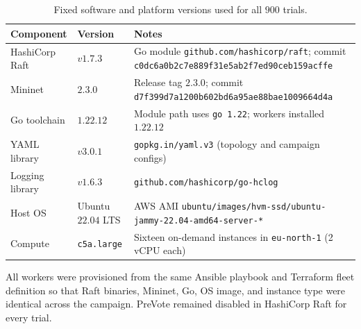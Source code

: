 \begin{table}[H]
  \centering
  \caption{Fixed software and platform versions used for all \(900\) trials.}
  \label{tab:software-versions}
  \footnotesize
  \begin{tabular}{llp{6.2cm}}
    \toprule
    Component & Version & Notes \\
    \midrule
    HashiCorp Raft & \(v1.7.3\) & Go module \texttt{github.com/hashicorp/raft}; commit \texttt{c0dc6a0b2c7e889f31e5ab2f7ed90ceb159acffe}~\cite{hashicorp_raft} \\
    Mininet & \(2.3.0\) & Release tag \(2.3.0\); commit \texttt{d7f399d7a1200b602bd6a95ae88bae1009664d4a}~\cite{mininet230,lantz2010mininet} \\
    Go toolchain & \(1.22.12\) & Module path uses \texttt{go 1.22}; workers installed \(1.22.12\) \\
    YAML library & \(v3.0.1\) & \texttt{gopkg.in/yaml.v3} (topology and campaign configs) \\
    Logging library & \(v1.6.3\) & \texttt{github.com/hashicorp/go-hclog} \\
    Host OS & Ubuntu \(22.04\) LTS & AWS AMI \texttt{ubuntu/images/hvm-ssd/ubuntu-jammy-22.04-amd64-server-*} \\
    Compute & \texttt{c5a.large} & Sixteen on-demand instances in \texttt{eu-north-1} (2\,vCPU each) \\
    \bottomrule
  \end{tabular}
\end{table}

All workers were provisioned from the same Ansible playbook and Terraform fleet definition so that Raft binaries, Mininet, Go, OS image, and instance type were identical across the campaign.
PreVote remained disabled in HashiCorp Raft for every trial.
